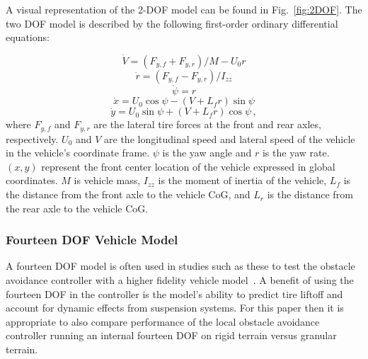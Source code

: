 \documentclass[12pt,twocolumn]{article}
\begin{document}
A visual representation of the 2-DOF model can be found in Fig.~\ref{fig:2DOF}. The two DOF model is described by the following first-order ordinary differential equations:

\begin{equation}\label{e:2DOF_Vdot}
\dot{V} = \left(F_{y,f} + F_{y,r}\right)/{M - U_0r} 
\end{equation}
\begin{equation}\label{e:2DOF_rdot}
\dot{r} = \left(F_{y,f} - F_{y,r}\right)/I_{zz}
\end{equation}
\begin{equation}\label{e:2DOF_psidot}
\dot{\psi} = r 
\end{equation}
\begin{equation}\label{e:2DOF_xdot}
\dot{x} = U_0\cos{\psi}-\left(V+L_fr\right)\sin{\psi}
\end{equation}
\begin{equation}\label{e:2DOF_ydot}
\dot{y} = U_0\sin{\psi}+\left(V+L_fr\right)\cos{\psi} \,,
\end{equation}
%
where $F_{y,f}$ and $F_{y,r}$ are the lateral tire forces at the front and rear axles, respectively. $U_0$ and $V$ are the longitudinal speed and lateral speed of the vehicle in the vehicle’s coordinate frame. $\psi$ is the yaw angle and $r$ is the yaw rate. $\left(x,y\right)$ represent the front center location of the vehicle expressed in global coordinates. $M$ is vehicle mass, $I_{zz}$ is the moment of inertia of the vehicle, $L_f$ is the distance from the front axle to the vehicle CoG, and $L_r$ is the distance from the rear axle to the vehicle CoG.



\subsubsection{Fourteen DOF Vehicle Model}\label{sss:14DOFModel}
A fourteen DOF model is often used in studies such as these to test the obstacle avoidance controller with a higher fidelity vehicle model~\cite{ModelFidelity2016, ModelFidelity2013}. A benefit of using the fourteen DOF in the controller is the model’s ability to predict tire liftoff and account for dynamic effects from suspension systems. For this paper then it is appropriate to also compare performance of the local obstacle avoidance controller running an internal fourteen DOF on rigid terrain versus granular terrain.  
\end{document}
